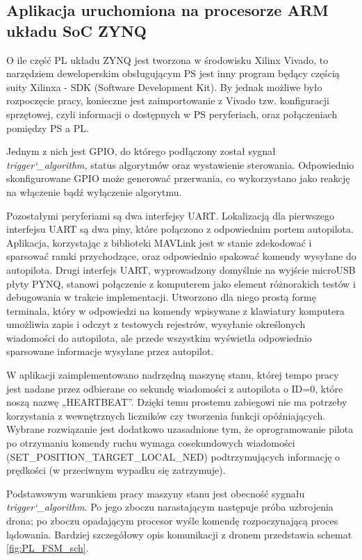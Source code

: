 \subsection{Aplikacja uruchomiona na procesorze ARM układu SoC ZYNQ}
O ile część PL układu ZYNQ jest tworzona w środowisku Xilinx Vivado, to narzędziem deweloperskim obsługującym PS jest inny program będący częścią suity Xilinxa - SDK (Software Development Kit). By jednak możliwe było rozpoczęcie pracy, konieczne jest zaimportowanie z Vivado tzw. konfiguracji sprzętowej, czyli informacji o dostępnych w PS peryferiach, oraz połączeniach pomiędzy PS a PL.

Jednym z nich jest GPIO, do którego podłączony został sygnał \textit{trigger\char`_algorithm}, status algorytmów oraz wystawienie sterowania. Odpowiednio skonfigurowane GPIO może generować przerwania, co wykorzystano jako reakcję na włączenie bądź wyłączenie algorytmu.

Pozostałymi peryferiami są dwa interfejsy UART. Lokalizacją dla pierwszego interfejsu UART są dwa piny, które połączono z odpowiednim portem autopilota. Aplikacja, korzystając z biblioteki MAVLink jest w stanie zdekodować i sparsować ramki przychodzące, oraz odpowiednio spakować komendy wysyłane do autopilota.
\newline Drugi interfejs UART, wyprowadzony domyślnie na wyjście microUSB płyty PYNQ, stanowi połączenie z komputerem jako element różnorakich testów i debugowania w trakcie implementacji. Utworzono dla niego prostą formę terminala, który w odpowiedzi na komendy wpisywane z klawiatury komputera umożliwia zapis i odczyt z testowych rejestrów, wysyłanie określonych wiadomości do autopilota, ale przede wszystkim wyświetla odpowiednio sparsowane informacje wysyłane przez autopilot.

W aplikacji zaimplementowano nadrzędną maszynę stanu, której tempo pracy jest nadane przez odbierane co sekundę wiadomości z autopilota o ID=0, które noszą nazwę „HEARTBEAT”. Dzięki temu prostemu zabiegowi nie ma potrzeby korzystania z wewnętrznych liczników czy tworzenia funkcji opóźniających. Wybrane rozwiązanie jest dodatkowo uzasadnione tym, że oprogramowanie pilota po otrzymaniu komendy ruchu wymaga cosekundowych wiadomości (SET\_POSITION\_TARGET\_LOCAL\_NED) podtrzymujących informację o prędkości (w przeciwnym wypadku się zatrzymuje). 

Podstawowym warunkiem pracy maszyny stanu jest obecność sygnału \textit{trigger\char`_algorithm}. Po jego zboczu narastającym następuje próba uzbrojenia drona; po zboczu opadającym procesor wyśle komendę rozpoczynającą proces lądowania. Bardziej szczegółowy opis komunikacji z dronem przedstawia schemat \ref{fig:PL_FSM_sch}.


